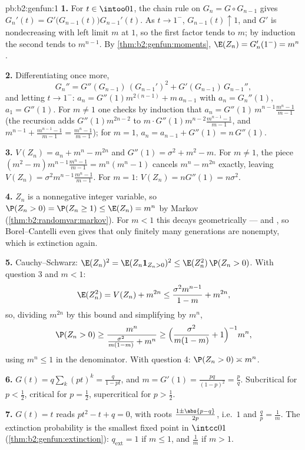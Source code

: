\begin{solution}{pb:b2:genfun:1}
\textbf{1.} For $t \in \intoo01$, the chain rule on $G_n = G
\circ G_{n-1}$ gives $G_n'(t) =
G'\bigl(G_{n-1}(t)\bigr)G_{n-1}'(t)$. As $t \to 1^-$,
$G_{n-1}(t) \uparrow 1$, and $G'$ is nondecreasing with
left limit $m$ at $1$, so the first factor tends to $m$; by
induction the second tends to $m^{n-1}$. By
\cref{thm:b2:genfun:moments}, $\E(Z_n) = G_n'(1^-) = m^n$.

\textbf{2.} Differentiating once more,
\[
G_n'' = G''(G_{n-1})\,(G_{n-1}')^2 +
G'(G_{n-1})\,G_{n-1}'',
\]
and letting $t \to 1^-$: $a_n = G''(1)m^{2(n-1)} + m\,
a_{n-1}$ with $a_n = G_n''(1)$, $a_1 = G''(1)$. For $m \neq
1$ one checks by induction that $a_n = G''(1)\,m^{n-1}
\frac{m^n - 1}{m - 1}$ (the recursion adds $G''(1)m^{2n-2}$
to $m\cdot G''(1)m^{n-2}\frac{m^{n-1}-1}{m-1}$, and
$m^{n-1} + \frac{m^{n-1}-1}{m-1} = \frac{m^n - 1}{m-1}$);
for $m = 1$, $a_n = a_{n-1} + G''(1) = n\,G''(1)$.

\textbf{3.} $V(Z_n) = a_n + m^n - m^{2n}$ and $G''(1) =
\sigma^2 + m^2 - m$. For $m \neq 1$, the piece $(m^2 -
m)m^{n-1}\frac{m^n-1}{m-1} = m^n(m^n - 1)$ cancels $m^n -
m^{2n}$ exactly, leaving $V(Z_n) =
\sigma^2m^{n-1}\frac{m^n-1}{m-1}$. For $m = 1$: $V(Z_n) =
nG''(1) = n\sigma^2$.

\textbf{4.} $Z_n$ is a nonnegative integer variable, so
$\P(Z_n > 0) = \P(Z_n \geq 1) \leq \E(Z_n) = m^n$ by Markov
(\cref{thm:b2:randomvar:markov}). For $m < 1$ this decays
geometrically --- and , so Borel--Cantelli even gives
that only finitely many generations are nonempty, which is
extinction again.

\textbf{5.} Cauchy--Schwarz: $\E(Z_n)^2 = \E(Z_n\mathbf
1_{Z_n>0})^2 \leq \E(Z_n^2)\,\P(Z_n > 0)$. With question 3
and $m < 1$:
\[
\E(Z_n^2) = V(Z_n) + m^{2n}
\leq \frac{\sigma^2m^{n-1}}{1-m} + m^{2n},
\]
so, dividing $m^{2n}$ by this bound and simplifying by
$m^n$,
\[
\P(Z_n > 0) \geq \frac{m^n}{\frac{\sigma^2}{m(1-m)} + m^n}
\geq \Bigl(\frac{\sigma^2}{m(1-m)} + 1\Bigr)^{-1}m^n ,
\]
using $m^n \leq 1$ in the denominator. With question 4:
$\P(Z_n > 0) \asymp m^n$.

\textbf{6.} $G(t) = q\sum_k(pt)^k = \frac{q}{1 - pt}$, and $m
= G'(1) = \frac{pq}{(1-p)^2} = \frac pq$. Subcritical for $p
< \frac12$, critical for $p = \frac12$, supercritical for $p
> \frac12$.

\textbf{7.} $G(t) = t$ reads $pt^2 - t + q = 0$, with roots
$\frac{1 \pm \abs{p - q}}{2p}$, i.e.\ $1$ and $\frac qp =
\frac1m$. The extinction probability is the smallest fixed
point in $\intcc01$ (\cref{thm:b2:genfun:extinction}):
$q_{\mathrm{ext}} = 1$ if $m \leq 1$, and $\frac1m$ if $m >
1$.


\end{solution}
